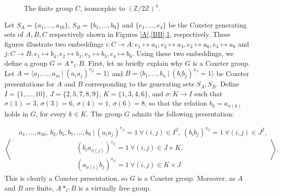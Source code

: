 \documentclass[a4paper, 11pt]{amsart}
\theoremstyle{definition}
\theoremstyle{remark}
\begin{document}
\begin{figure}[h!]
  \centering
  \caption{The finite group $C$, isomorphic to $(\mathbb{Z}/2\mathbb{Z})^4$.}
  \label{CC}
\end{figure}

\noindent Let $S_A=\lbrace a_1,\ldots,a_{10}\rbrace$, $S_B = \lbrace b_1,\ldots,b_{9}\rbrace$ and $\lbrace e_1,\ldots,e_4\rbrace$ be the Coxeter generating sets of $A,B,C$ respectively shown in Figures \ref{A},\ref{BB},\ref{CC}, respectively. These figures illustrate two embeddings $i:C\rightarrow A:e_1\mapsto a_1,e_2\mapsto a_3, e_3\mapsto a_6,e_4\mapsto a_8$ and $j:C\rightarrow B:e_1\mapsto b_4,e_2\mapsto b_1, e_3\mapsto b_3,e_4\mapsto b_6$. Using these two embeddings, we define a group $G=A\ast_C B$. First, let us briefly explain why $G$ is a Coxeter group. Let  $A=\langle a_1,\ldots,a_m \ \vert \ (a_ia_j)^{r_{ij}}=1\rangle$ and $B=\langle b_1,\ldots,b_n \ \vert \ (b_ib_j)^{s_{ij}}=1\rangle$ be Coxeter presentations for $A$ and $B$ corresponding to the generating sets $S_A,S_B$. Define $I=\lbrace 1,\ldots ,10\rbrace$, $J=\lbrace 2,5,7,8,9\rbrace$, $K=\lbrace 1,3,4,6\rbrace$, and $\sigma : K \rightarrow I$ such that $\sigma(1)=3$, $\sigma(3)=6$, $\sigma(4)=1$, $\sigma(6)=8$, so that the relation $b_k=a_{\sigma(k)}$ holds in $G$, for every $k\in K$. The group $G$ admits the following presentation:


\[
\left\langle
\begin{aligned}
  & a_1,\ldots,a_{10},\, b_2,b_5,b_7,\ldots,b_9 \ \vert \  (a_i a_j)^{r_{ij}}=1 \ \forall (i,j)\in I^2, \ (b_i b_j)^{s_{ij}}=1 \ \forall (i,j)\in J^2,\\
  & \ \ \ \ \ \ \ \ \ \ \ \ \ \ \ \ \ \ \ \ \ \ \ \ \ \ \ \ \ \ \ \ \ \ \ \ \ \ (b_i a_{\sigma(j)})^{s_{ij}}=1 \ \forall (i,j)\in J\times K, \\
  & \ \ \ \ \ \ \ \ \ \ \ \ \ \ \ \ \ \ \ \ \ \ \ \ \ \ \ \ \ \ \ \ \ \ \ \ \ \ (a_{\sigma(i)} b_j)^{s_{ij}}=1 \ \forall (i,j)\in K\times J
\end{aligned}
\right\rangle.
\]
This is clearly a Coxeter presentation, so $G$ is a Coxeter group. Moreover, as $A$ and $B$ are finite, $A\ast_C B$ is a virtually free group.
\end{document}
